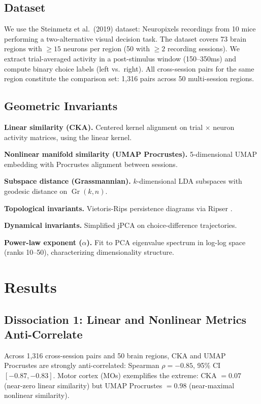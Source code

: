 \documentclass{article}
\begin{document}
\subsection{Dataset}

We use the Steinmetz et al.\ (2019) dataset: Neuropixels recordings from 10 mice performing a two-alternative visual decision task. The dataset covers 73 brain regions with $\geq 15$ neurons per region (50 with $\geq 2$ recording sessions). We extract trial-averaged activity in a post-stimulus window (150--350ms) and compute binary choice labels (left vs.\ right). All cross-session pairs for the same region constitute the comparison set: 1,316 pairs across 50 multi-session regions.

\subsection{Geometric Invariants}

\textbf{Linear similarity (CKA).} Centered kernel alignment \citep{kornblith2019similarity} on trial $\times$ neuron activity matrices, using the linear kernel.

\textbf{Nonlinear manifold similarity (UMAP Procrustes).} 5-dimensional UMAP embedding \citep{mcinnes2018umap} with Procrustes alignment between sessions.

\textbf{Subspace distance (Grassmannian).} $k$-dimensional LDA subspaces with geodesic distance on $\operatorname{Gr}(k, n)$.

\textbf{Topological invariants.} Vietoris-Rips persistence diagrams via Ripser \citep{bauer2021ripser}.

\textbf{Dynamical invariants.} Simplified jPCA on choice-difference trajectories.

\textbf{Power-law exponent ($\alpha$).} Fit to PCA eigenvalue spectrum in log-log space (ranks 10--50), characterizing dimensionality structure.

\section{Results}

\subsection{Dissociation 1: Linear and Nonlinear Metrics Anti-Correlate}

Across 1,316 cross-session pairs and 50 brain regions, CKA and UMAP Procrustes are strongly anti-correlated: Spearman $\rho = -0.85$, 95\% CI $[-0.87, -0.83]$. Motor cortex (MOs) exemplifies the extreme: CKA $= 0.07$ (near-zero linear similarity) but UMAP Procrustes $= 0.98$ (near-maximal nonlinear similarity).
\end{document}
